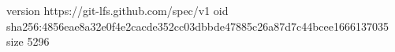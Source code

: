 version https://git-lfs.github.com/spec/v1
oid sha256:4856eae8a32e0f4e2cacde352cc03dbbde47885c26a87d7c44bcee1666137035
size 5296
